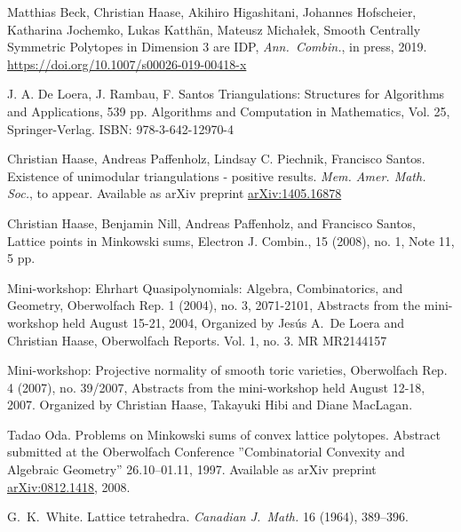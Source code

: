 \documentclass{amsart}
\theoremstyle{plain}
\theoremstyle{definition}
\begin{document}
\begin{thebibliography}{99}

Matthias Beck, Christian Haase, Akihiro Higashitani, Johannes Hofscheier, Katharina Jochemko, Lukas Katth\"an, Mateusz Micha{\l}ek,
Smooth Centrally Symmetric Polytopes in Dimension 3 are IDP,
\emph{Ann.~Combin.}, in press, 2019.
\url{https://doi.org/10.1007/s00026-019-00418-x}

J. A. De Loera, J. Rambau, F. Santos
Triangulations: Structures for Algorithms and Applications, 539 pp.
Algorithms and Computation in Mathematics, Vol. 25, Springer-Verlag. 
ISBN: 978-3-642-12970-4

Christian Haase, Andreas Paffenholz, Lindsay C. Piechnik, Francisco Santos. Existence of unimodular triangulations - positive results. 
 \emph{Mem. Amer. Math. Soc.}, to appear.
 Available as arXiv preprint \href{https://arxiv.org/abs/1405.1687}{arXiv:1405.16878}
 
Christian Haase, Benjamin Nill, Andreas Paffenholz, and Francisco Santos, Lattice points in Minkowski sums, 
Electron J. Combin., 15 (2008), no. 1, Note 11, 5 pp.

Mini-workshop: Ehrhart Quasipolynomials: Algebra, Combinatorics, and Geometry, Oberwolfach Rep. 1 (2004), no. 3, 2071-2101, Abstracts from the mini-workshop held August 15-21, 2004, Organized by Jes\'us A.~De Loera and Christian Haase, Oberwolfach Reports. Vol. 1, no. 3. MR MR2144157

Mini-workshop: Projective normality of smooth toric varieties, Oberwolfach Rep. 4 (2007), no. 39/2007, Abstracts from the mini-workshop held August 12-18, 2007. Organized by Christian Haase, Takayuki Hibi and Diane MacLagan.


Tadao Oda. Problems on Minkowski sums of convex lattice polytopes. 
Abstract submitted at the Oberwolfach Conference ''Combinatorial Convexity and Algebraic Geometry'' 26.10--01.11, 1997.
Available as arXiv preprint \href{https://arxiv.org/abs/0812.1418}{arXiv:0812.1418}, 2008.

G.~K.~White.
Lattice tetrahedra.
\emph{Canadian J.~Math.} 16 (1964), 389--396.

\end{thebibliography}
\end{document}
